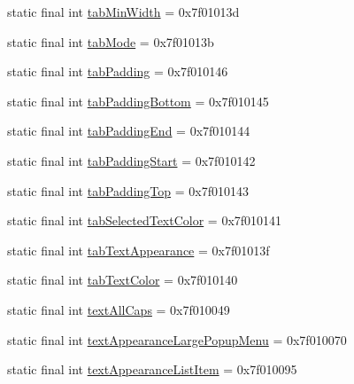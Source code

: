 \begin{CompactItemize}
static final int \hyperlink{classandroid_1_1support_1_1graphics_1_1drawable_1_1animated_1_1_r_1_1attr_298a5027820cc88824e6a3668d61fcb0}{tabMinWidth} = 0x7f01013d
\item 
static final int \hyperlink{classandroid_1_1support_1_1graphics_1_1drawable_1_1animated_1_1_r_1_1attr_6751be722c127ab3ef9c7ca72aaab8a6}{tabMode} = 0x7f01013b
\item 
static final int \hyperlink{classandroid_1_1support_1_1graphics_1_1drawable_1_1animated_1_1_r_1_1attr_778fe28f438cff3096d1dee788906926}{tabPadding} = 0x7f010146
\item 
static final int \hyperlink{classandroid_1_1support_1_1graphics_1_1drawable_1_1animated_1_1_r_1_1attr_8d406ba506b18750653c5eac1109b6cd}{tabPaddingBottom} = 0x7f010145
\item 
static final int \hyperlink{classandroid_1_1support_1_1graphics_1_1drawable_1_1animated_1_1_r_1_1attr_a643bc888de4dbb7fc09d496b957c8cc}{tabPaddingEnd} = 0x7f010144
\item 
static final int \hyperlink{classandroid_1_1support_1_1graphics_1_1drawable_1_1animated_1_1_r_1_1attr_34565d538adcdf2171fa7bcaef0f35f2}{tabPaddingStart} = 0x7f010142
\item 
static final int \hyperlink{classandroid_1_1support_1_1graphics_1_1drawable_1_1animated_1_1_r_1_1attr_d5899653e0ef562ee432478ee632d65d}{tabPaddingTop} = 0x7f010143
\item 
static final int \hyperlink{classandroid_1_1support_1_1graphics_1_1drawable_1_1animated_1_1_r_1_1attr_c50ab644a6f380cd7a2ec68c86d115b4}{tabSelectedTextColor} = 0x7f010141
\item 
static final int \hyperlink{classandroid_1_1support_1_1graphics_1_1drawable_1_1animated_1_1_r_1_1attr_096fd306bf95811148b4b4547d9cf4d0}{tabTextAppearance} = 0x7f01013f
\item 
static final int \hyperlink{classandroid_1_1support_1_1graphics_1_1drawable_1_1animated_1_1_r_1_1attr_cb1f5929625770f3532d7c136a393cd9}{tabTextColor} = 0x7f010140
\item 
static final int \hyperlink{classandroid_1_1support_1_1graphics_1_1drawable_1_1animated_1_1_r_1_1attr_f3593b56668cc8f5a7e7445dbca6e418}{textAllCaps} = 0x7f010049
\item 
static final int \hyperlink{classandroid_1_1support_1_1graphics_1_1drawable_1_1animated_1_1_r_1_1attr_3adbbd097629a31e698cb1256d8f21f6}{textAppearanceLargePopupMenu} = 0x7f010070
\item 
static final int \hyperlink{classandroid_1_1support_1_1graphics_1_1drawable_1_1animated_1_1_r_1_1attr_5aad695d82328429591c0ef9055d015e}{textAppearanceListItem} = 0x7f010095

\end{CompactItemize}
